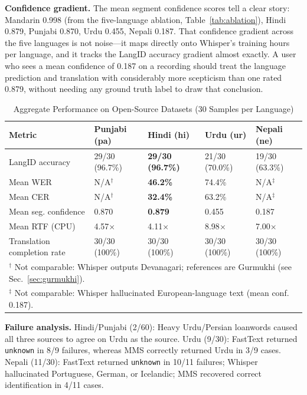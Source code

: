 \documentclass[12pt, onecolumn]{IEEEtran}
\begin{document}
\textbf{Confidence gradient.} The mean segment confidence scores tell a clear story: Mandarin 0.998 (from the five-language ablation, Table~\ref{tab:ablation}), Hindi 0.879, Punjabi 0.870, Urdu 0.455, Nepali 0.187. That confidence gradient across the five languages is not noise---it maps directly onto Whisper's training hours per language, and it tracks the LangID accuracy gradient almost exactly. A user who sees a mean confidence of 0.187 on a recording should treat the language prediction and translation with considerably more scepticism than one rated 0.879, without needing any ground truth label to draw that conclusion.

\begin{table}[htbp]
\caption{Aggregate Performance on Open-Source Datasets (30 Samples per Language)}
\label{tab:largescale}
\begin{center}
\begin{tabular}{lllll}
\toprule
\textbf{Metric} & \textbf{Punjabi (pa)} & \textbf{Hindi (hi)} & \textbf{Urdu (ur)} & \textbf{Nepali (ne)} \\
\midrule
LangID accuracy & 29/30 (96.7\%) & \textbf{29/30 (96.7\%)} & 21/30 (70.0\%) & 19/30 (63.3\%) \\
Mean WER & N/A$^\dagger$ & \textbf{46.2\%} & 74.4\% & N/A$^\ddagger$ \\
Mean CER & N/A$^\dagger$ & \textbf{32.4\%} & 63.2\% & N/A$^\ddagger$ \\
Mean seg. confidence & 0.870 & \textbf{0.879} & 0.455 & 0.187 \\
Mean RTF (CPU) & 4.57$\times$ & 4.11$\times$ & 8.98$\times$ & 7.00$\times$ \\
Translation completion rate & 30/30 (100\%) & 30/30 (100\%) & 30/30 (100\%) & 30/30 (100\%) \\
\midrule
\multicolumn{5}{l}{\footnotesize $^\dagger$ Not comparable: Whisper outputs Devanagari; references are Gurmukhi (see Sec.~\ref{sec:gurmukhi}).} \\
\multicolumn{5}{l}{\footnotesize $^\ddagger$ Not comparable: Whisper hallucinated European-language text (mean conf. 0.187).} \\
\bottomrule
\end{tabular}
\end{center}
\end{table}

\textbf{Failure analysis.} Hindi/Punjabi (2/60): Heavy Urdu/Persian loanwords caused all three sources to agree on Urdu as the source. Urdu (9/30): FastText returned \texttt{unknown} in 8/9 failures, whereas MMS correctly returned Urdu in 3/9 cases. Nepali (11/30): FastText returned \texttt{unknown} in 10/11 failures; Whisper hallucinated Portuguese, German, or Icelandic; MMS recovered correct identification in 4/11 cases.
\end{document}
